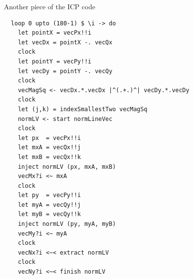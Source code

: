 \documentclass[pdf]{beamer}
\begin{document}
\begin{frame}[fragile]{Another piece of the ICP code}
\begin{footnotesize}
\begin{verbatim}
  loop 0 upto (180-1) $ \i -> do
    let pointX = vecPx!!i
    let vecDx = pointX -. vecQx
    clock
    let pointY = vecPy!!i
    let vecDy = pointY -. vecQy
    clock
    vecMagSq <- vecDx.*.vecDx |^(.+.)^| vecDy.*.vecDy
    clock
    let (j,k) = indexSmallestTwo vecMagSq
    normLV <- start normLineVec
    clock
    let px  = vecPx!!i
    let mxA = vecQx!!j
    let mxB = vecQx!!k
    inject normLV (px, mxA, mxB)
    vecMx?i <~ mxA
    clock
    let py  = vecPy!!i
    let myA = vecQy!!j
    let myB = vecQy!!k
    inject normLV (py, myA, myB)
    vecMy?i <~ myA
    clock
    vecNx?i <~< extract normLV
    clock
    vecNy?i <~< finish normLV
\end{verbatim}
\end{footnotesize}


\end{frame}
\end{document}
